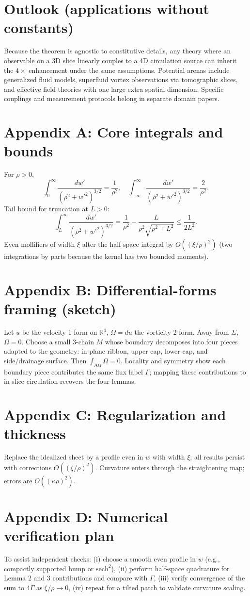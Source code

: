 \documentclass[11pt]{article}
\begin{document}
\section{Outlook (applications without constants)}
Because the theorem is agnostic to constitutive details, any theory where an observable on a 3D slice linearly couples to a 4D circulation source can inherit the $4\times$ enhancement under the same assumptions. Potential arenas include generalized fluid models, superfluid vortex observations via tomographic slices, and effective field theories with one large extra spatial dimension. Specific couplings and measurement protocols belong in separate domain papers.

\appendix
\section*{Appendix A: Core integrals and bounds}
For $\rho>0$,
\[
\int_0^{\infty}\!\frac{dw'}{(\rho^2+w'^2)^{3/2}}=\frac{1}{\rho^2},\quad
\int_{-\infty}^{\infty}\!\frac{dw'}{(\rho^2+w'^2)^{3/2}}=\frac{2}{\rho^2}.
\]
Tail bound for truncation at $L>0$:
\[
\int_L^{\infty}\!\frac{dw'}{(\rho^2+w'^2)^{3/2}}=\frac{1}{\rho^2}-\frac{L}{\rho^2\sqrt{\rho^2+L^2}}\le \frac{1}{2L^2}.
\]
Even mollifiers of width $\xi$ alter the half-space integral by $O((\xi/\rho)^2)$ (two integrations by parts because the kernel has two bounded moments).

\section*{Appendix B: Differential-forms framing (sketch)}
Let $u$ be the velocity 1-form on $\mathbb R^4$, $\Omega=du$ the vorticity 2-form. Away from $\Sigma$, $\Omega=0$. Choose a small 3-chain $M$ whose boundary decomposes into four pieces adapted to the geometry: in-plane ribbon, upper cap, lower cap, and side/drainage surface. Then $\int_{\partial M}\Omega=0$. Locality and symmetry show each boundary piece contributes the same flux label $\Gamma$; mapping these contributions to in-slice circulation recovers the four lemmas.

\section*{Appendix C: Regularization and thickness}
Replace the idealized sheet by a profile even in $w$ with width $\xi$; all results persist with corrections $O((\xi/\rho)^2)$. Curvature enters through the straightening map; errors are $O((\kappa\rho)^2)$.

\section*{Appendix D: Numerical verification plan}
To assist independent checks: (i) choose a smooth even profile in $w$ (e.g., compactly supported bump or $\mathrm{sech}^2$), (ii) perform half-space quadrature for Lemma 2 and 3 contributions and compare with $\Gamma$, (iii) verify convergence of the sum to $4\Gamma$ as $\xi/\rho\to0$, (iv) repeat for a tilted patch to validate curvature scaling.
\end{document}
